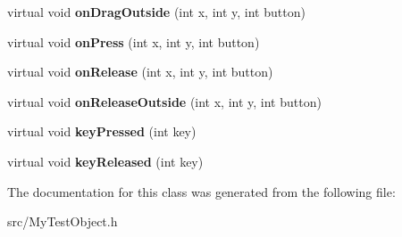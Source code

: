 \begin{DoxyCompactItemize}
\item 
\hypertarget{class_my_test_object_a8825ad5268d33fc35c77c986b2b1a051}{
virtual void {\bfseries onDragOutside} (int x, int y, int button)}
\label{class_my_test_object_a8825ad5268d33fc35c77c986b2b1a051}

\item 
\hypertarget{class_my_test_object_a551cb17e396baf6e98ff37ce6c1aac46}{
virtual void {\bfseries onPress} (int x, int y, int button)}
\label{class_my_test_object_a551cb17e396baf6e98ff37ce6c1aac46}

\item 
\hypertarget{class_my_test_object_a33cd324edcdb0ce2985c3b14e507ece8}{
virtual void {\bfseries onRelease} (int x, int y, int button)}
\label{class_my_test_object_a33cd324edcdb0ce2985c3b14e507ece8}

\item 
\hypertarget{class_my_test_object_aa0201a0c25199519bba56b1462189668}{
virtual void {\bfseries onReleaseOutside} (int x, int y, int button)}
\label{class_my_test_object_aa0201a0c25199519bba56b1462189668}

\item 
\hypertarget{class_my_test_object_aabd63f86e7311d0b1f30376a2d21e060}{
virtual void {\bfseries keyPressed} (int key)}
\label{class_my_test_object_aabd63f86e7311d0b1f30376a2d21e060}

\item 
\hypertarget{class_my_test_object_ac1bb30fe2537ef1b868db18805798875}{
virtual void {\bfseries keyReleased} (int key)}
\label{class_my_test_object_ac1bb30fe2537ef1b868db18805798875}

\end{DoxyCompactItemize}


The documentation for this class was generated from the following file:\begin{DoxyCompactItemize}
\item 
src/MyTestObject.h\end{DoxyCompactItemize}
